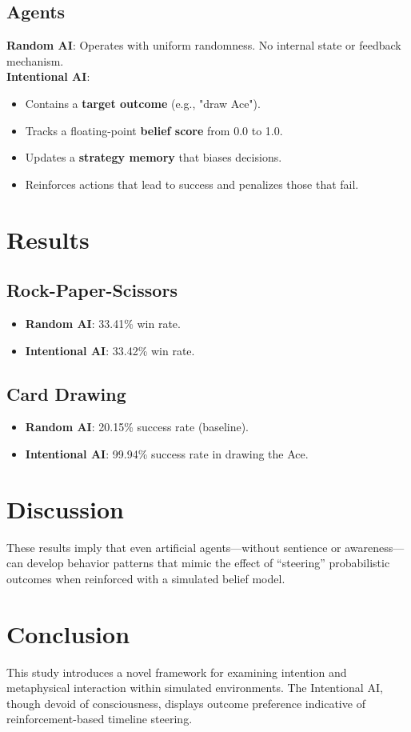 \documentclass{article}
\begin{document}
\subsection{Agents}
\textbf{Random AI}: Operates with uniform randomness. No internal state or feedback mechanism.\\
\textbf{Intentional AI}: 
\begin{itemize}
    \item Contains a \textbf{target outcome} (e.g., "draw Ace").
    \item Tracks a floating-point \textbf{belief score} from 0.0 to 1.0.
    \item Updates a \textbf{strategy memory} that biases decisions.
    \item Reinforces actions that lead to success and penalizes those that fail.
\end{itemize}

\section{Results}
\subsection{Rock-Paper-Scissors}
\begin{itemize}
    \item \textbf{Random AI}: 33.41\% win rate.
    \item \textbf{Intentional AI}: 33.42\% win rate.
\end{itemize}

\subsection{Card Drawing}
\begin{itemize}
    \item \textbf{Random AI}: 20.15\% success rate (baseline).
    \item \textbf{Intentional AI}: 99.94\% success rate in drawing the Ace.
\end{itemize}

\section{Discussion}
These results imply that even artificial agents—without sentience or awareness—can develop behavior patterns that mimic the effect of “steering” probabilistic outcomes when reinforced with a simulated belief model.

\section{Conclusion}
This study introduces a novel framework for examining intention and metaphysical interaction within simulated environments. The Intentional AI, though devoid of consciousness, displays outcome preference indicative of reinforcement-based timeline steering.
\end{document}
